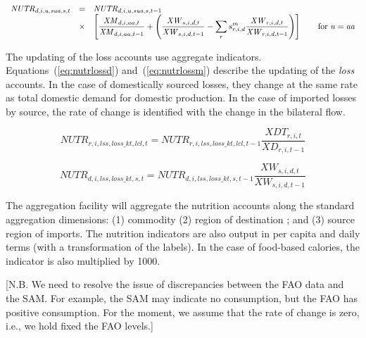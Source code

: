 \documentclass[11pt,letterpaper]{report}
\begin{document}
\begin{equation}
\label{eq:nutrm}
\begin{array}{l c l}
\mathit{NUTR}_{d,i,u,\mathit{sua},s,t}  & = &
\mathit{NUTR}_{d,i,u,\mathit{sua},s,t-1} \\
{} & {\times} & \left[\displaystyle \frac{\mathit{XM}_{d,i,aa,t}}{\mathit{XM}_{d,i,aa,t-1}}
+\left(
\frac{\mathit{XW}_{s,i,d,t}}{\mathit{XW}_{s,i,d,t-1}}
- \sum_{r}{s^m_{r,i,d}\frac{\mathit{XW}_{r,i,d,t}}{\mathit{XW}_{r,i,d,t-1}}}
\right)\right]
\qquad \textnormal{for } u = \mathit{aa} \\
\end{array}
\end{equation}

The updating of the loss accounts use aggregate indicators.
Equations~(\ref{eq:nutrlossd}) and~(\ref{eq:nutrlossm})
describe the updating of the \emph{loss} accounts.
In the case of domestically sourced losses, they change
at the same rate as total domestic demand for domestic
production. In the case of imported losses by source, the rate
of change is identified with the change in the bilateral flow.

\begin{equation}
\label{eq:nutrlossd}
\mathit{NUTR}_{r,i,\mathit{lss},\mathit{loss\_kt},\mathit{lcl},t} =
\mathit{NUTR}_{r,i,\mathit{lss},\mathit{loss\_kt},\mathit{lcl},t-1}
\displaystyle \frac{\mathit{XDT}_{r,i,t}}{\mathit{XD}_{r,i,t-1}}
\end{equation}

\begin{equation}
\label{eq:nutrlossm}
\mathit{NUTR}_{d,i,\mathit{lss},\mathit{loss\_kt},s,t} =
\mathit{NUTR}_{d,i,\mathit{lss},\mathit{loss\_kt},s,t-1}
\displaystyle \frac{\mathit{XW}_{s,i,d,t}}{\mathit{XW}_{s,i,d,t-1}}
\end{equation}

The aggregation facility will aggregate the nutrition accounts
along the standard aggregation dimensions: (1) commodity
(2) region of destination ; and (3) source region of imports.
The nutrition indicators are also output in
per capita and daily terms (with a transformation of the labels).
In the case of food-based calories, the indicator is also
multiplied by 1000.

[N.B. We need to resolve the issue of discrepancies between
the FAO data and the SAM. For example, the SAM may indicate
no consumption, but the FAO has positive consumption. For the
moment, we assume that the rate of change is zero, i.e.,
we hold fixed the FAO levels.]
\end{document}
